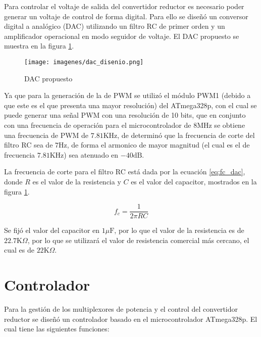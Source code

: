     Para controlar el voltaje de salida del convertidor reductor es necesario
    poder generar un voltaje de control de forma digital. Para ello se diseñó
    un conversor digital a analógico (DAC) utilizando un filtro RC de primer
    orden y un amplificador operacional en modo seguidor de voltaje. El DAC
    propuesto se muestra en la figura \ref{fig:dac}.

    \begin{figure}[H]
        \centering
        \texttt{[image: imagenes/dac\_disenio.png]}
        \caption{DAC propuesto}
        \label{fig:dac}
    \end{figure}

    Ya que para la generación de la de PWM se utilizó el módulo PWM1 (debido
    a que este es el que presenta una mayor resolución) del ATmega328p, con el 
    cual se puede generar una señal PWM con una resolución de 10 bits, que en
    conjunto con una frecuencia de operación para el microcontrolador de $8\text{MHz}$
    se obtiene una frecuencia de PWM de $7.81\text{KHz}$, de determinó que la 
    frecuencia de corte del filtro RC sea de $7\text{Hz}$, de forma el armonico
    de mayor magnitud (el cual es el de frecuencia $7.81\text{KHz}$) sea atenuado
    en $-40\text{dB}$. 

    La frecuencia de corte para el filtro RC está dada por la ecuación \ref{eq:fc_dac},
    donde $R$ es el valor de la resistencia y $C$ es el valor del capacitor, mostrados
    en la figura \ref{fig:dac}.

    \begin{equation}
        f_c = \frac{1}{2\pi RC}
        \label{eq:fc_dac}
    \end{equation}

    Se fijó el valor del capacitor en $1\mu\text{F}$, por lo que el valor de la
    resistencia es de $22.7\text{K}\Omega$, por lo que se utilizará el valor 
    de resistencia comercial más cercano, el cual es de $22\text{K}\Omega$.


\section{Controlador}

    Para la gestión de los multiplexores de potencia y el control del convertidor
    reductor se diseñó un controlador basado en el microcontrolador ATmega328p.
    El cual tiene las siguientes funciones:

